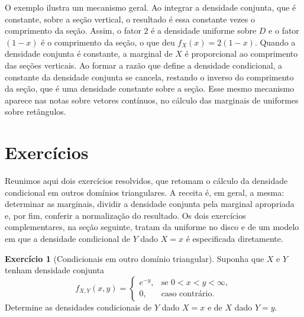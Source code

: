 \documentclass[12pt,portuguese]{article}
\theoremstyle{definition}
\theoremstyle{plainexercise}
\newtheorem{exercise}{Exercício}
\theoremstyle{starredexercise}
\theoremstyle{definition}
\begin{document}
O exemplo ilustra um mecanismo geral. Ao integrar a densidade conjunta, que é constante,
sobre a seção vertical, o resultado é essa constante vezes o comprimento da seção. Assim, o
fator $2$ é a densidade uniforme sobre $D$ e o fator $(1-x)$ é o comprimento da seção, o que
deu $f_X(x) = 2(1-x)$. Quando a densidade conjunta é constante, a marginal de $X$ é
proporcional ao comprimento das seções verticais. Ao formar a razão que define a densidade
condicional, a constante da densidade conjunta se cancela, restando o inverso
do comprimento da seção, que é uma densidade constante sobre a
seção. Esse mesmo mecanismo aparece nas notas sobre vetores contínuos, no cálculo das
marginais de uniformes sobre retângulos.

\section{Exercícios}\label{sec:exercicios-condicionais}

Reunimos aqui dois exercícios resolvidos, que retomam o cálculo da densidade condicional em
outros domínios triangulares. A receita é, em geral, a mesma: determinar as marginais,
dividir a densidade conjunta pela marginal apropriada e, por fim, conferir a normalização
do resultado. Os dois exercícios complementares, na seção seguinte, tratam da uniforme no
disco e de um modelo em que a densidade condicional de $Y$ dado $X = x$ é especificada
diretamente.

\begin{exercise}[Condicionais em outro domínio triangular]\label{exercise:condicional-exponencial}
Suponha que $X$ e $Y$ tenham densidade conjunta
\begin{equation}
  f_{X,Y}(x,y) =
  \begin{cases}
    e^{-y}, & \text{se } 0 < x < y < \infty, \\[0.2cm]
    0, & \text{caso contrário}.
  \end{cases}
  \label{eq:densidade-exercicio-660}
\end{equation}
Determine as densidades condicionais de $Y$ dado $X = x$ e de $X$ dado $Y = y$.
\end{exercise}
\end{document}

